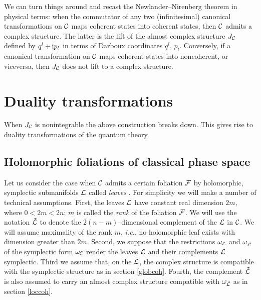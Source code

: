 \documentclass[a4paper,a4paper]{article}
\begin{document}
We can turn things around and recast the Newlander--Nirenberg 
theorem in physical terms: when the commutator of any two (infinitesimal) 
canonical transformations on ${\cal C}$ maps coherent states into coherent states, 
then ${\cal C}$ admits a complex structure. 
The latter is the lift of the almost complex structure $J_{\cal C}$ defined 
by $q^l+{\rm i}p_l$ in terms of Darboux coordinates $q^l$, $p_l$. Conversely, 
if a canonical transformation on ${\cal C}$ maps coherent states into 
noncoherent, or viceversa, then $J_{\cal C}$ does not lift to a complex 
structure.
 
\section{Duality transformations}\label{dual}

When $J_{\cal C}$ is nonintegrable the above construction breaks down.
This gives rise to duality transformations of the quantum theory.

\subsection{Holomorphic foliations of classical phase space}\label{nonint}

Let us consider the case when ${\cal C}$ admits a certain foliation ${\cal F}$ 
by holomorphic, symplectic submanifolds ${\cal L}$ called {\it leaves} \cite{DEWITT}. 
For simplicity we will make a number of technical assumptions. 
First, the leaves ${\cal L}$ have constant real dimension $2m$, 
where $0<2m<2n$; $m$ is called the {\it rank}\/ of the foliation ${\cal F}$. 
We will use the notation $\tilde{\cal L}$ to denote the $2(n-m)$--dimensional 
complement of the ${\cal L}$ in ${\cal C}$. We will assume maximality of 
the rank $m$, {\it i.e.}, no holomorphic leaf exists with dimension 
greater than $2m$. Second, we suppose that the restrictions 
$\omega_{\cal L}$  and $\omega_{\tilde {\cal L}}$ of the symplectic form $\omega_{\cal C}$ 
render the leaves ${\cal L}$ and their complements $\tilde{\cal L}$ symplectic.
Third we assume that, on the ${\cal L}$, the complex structure is 
compatible with the symplectic structure as in section \ref{globcoh}. 
Fourth, the complement $\tilde {\cal L}$ is also assumed to carry an almost 
complex structure compatible with $\omega_{\tilde {\cal L}}$ as in section \ref{loccoh}.
\end{document}
